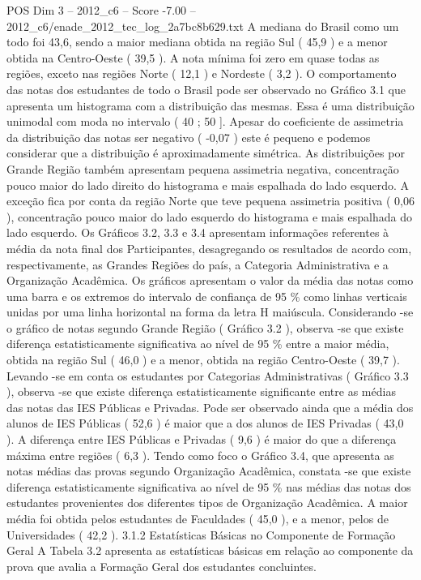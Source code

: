 \begin{textsample}{POS Dim 3 – 2012\_c6 – Score -7.00 – 2012\_c6/enade\_2012\_tec\_log\_2a7bc8b629.txt}
A mediana do Brasil como um todo foi 43,6, sendo a maior mediana obtida na região Sul ( 45,9 ) e a menor obtida na Centro-Oeste ( 39,5 ).
A nota mínima foi zero em quase todas as regiões, exceto nas regiões Norte ( 12,1 ) e Nordeste ( 3,2 ).
O comportamento das notas dos estudantes de todo o Brasil pode ser observado no Gráfico 3.1 que apresenta um histograma com a distribuição das mesmas.
Essa é uma distribuição unimodal com moda no intervalo ( 40 ; 50 ].
Apesar do coeficiente de assimetria da distribuição das notas ser negativo ( -0,07 ) este é pequeno e podemos considerar que a distribuição é aproximadamente simétrica.
As distribuições por Grande Região também apresentam pequena assimetria negativa, concentração pouco maior do lado direito do histograma e mais espalhada do lado esquerdo.
A exceção fica por conta da região Norte que teve pequena assimetria positiva ( 0,06 ), concentração pouco maior do lado esquerdo do histograma e mais espalhada do lado esquerdo.
Os Gráficos 3.2, 3.3 e 3.4 apresentam informações referentes à média da nota final dos Participantes, desagregando os resultados de acordo com, respectivamente, as Grandes Regiões do país, a Categoria Administrativa e a Organização Acadêmica.
Os gráficos apresentam o valor da média das notas como uma barra e os extremos do intervalo de confiança de 95 \% como linhas verticais unidas por uma linha horizontal na forma da letra H maiúscula.
Considerando -se o gráfico de notas segundo Grande Região ( Gráfico 3.2 ), observa -se que existe diferença estatisticamente significativa ao nível de 95 \% entre a maior média, obtida na região Sul ( 46,0 ) e a menor, obtida na região Centro-Oeste ( 39,7 ).
Levando -se em conta os estudantes por Categorias Administrativas ( Gráfico 3.3 ), observa -se que existe diferença estatisticamente significante entre as médias das notas das IES Públicas e Privadas.
Pode ser observado ainda que a média dos alunos de IES Públicas ( 52,6 ) é maior que a dos alunos de IES Privadas ( 43,0 ).
A diferença entre IES Públicas e Privadas ( 9,6 ) é maior do que a diferença máxima entre regiões ( 6,3 ).
Tendo como foco o Gráfico 3.4, que apresenta as notas médias das provas segundo Organização Acadêmica, constata -se que existe diferença estatisticamente significativa ao nível de 95 \% nas médias das notas dos estudantes provenientes dos diferentes tipos de Organização Acadêmica.
A maior média foi obtida pelos estudantes de Faculdades ( 45,0 ), e a menor, pelos de Universidades ( 42,2 ). 3.1.2 Estatísticas Básicas no Componente de Formação Geral A Tabela 3.2 apresenta as estatísticas básicas em relação ao componente da prova que avalia a Formação Geral dos estudantes concluintes.

\end{textsample}
